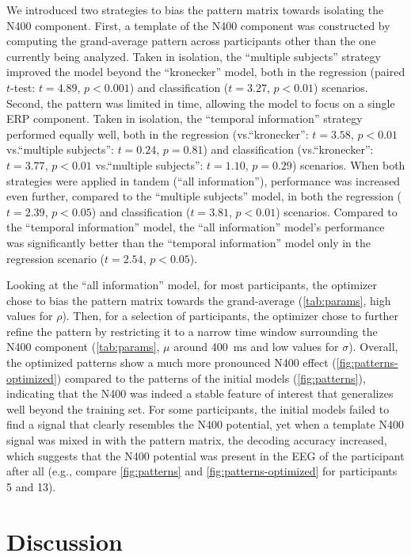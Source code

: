 \documentclass[a4paper]{vanvliet_paper}
\begin{document}
We introduced two strategies to bias the pattern matrix towards isolating the N400 component.
First, a template of the N400 component was constructed by computing the grand-average pattern across participants other than the one currently being analyzed.
Taken in isolation, the ``multiple subjects'' strategy improved the model beyond the ``kronecker'' model, both in the regression (paired $t$-test: $t=4.89$, $p<0.001$) and classification ($t=3.27$, $p<0.01$) scenarios.
Second, the pattern was limited in time, allowing the model to focus on a single \gls{ERP} component.
Taken in isolation, the ``temporal information'' strategy performed equally well, both in the regression (vs.\@ ``kronecker'': $t=3.58$, $p<0.01$ vs.\@ ``multiple subjects'': $t=0.24$, $p=0.81$) and classification (vs.\@ ``kronecker'': $t=3.77$, $p<0.01$ vs.\@ ``multiple subjects'': $t=1.10$, $p=0.29$) scenarios.
When both strategies were applied in tandem (``all information''), performance was increased even further, compared to the ``multiple subjects'' model, in both the regression ($t=2.39$, $p<0.05$) and classification ($t=3.81$, $p<0.01$) scenarios.
Compared to the ``temporal information'' model, the ``all information'' model's performance was significantly better than the ``temporal information'' model only in the regression scenario ($t=2.54$, $p<0.05$).

Looking at the ``all information'' model, for most participants, the optimizer chose to bias the pattern matrix towards the grand-average (\autoref{tab:params}, high values for $\rho$).
Then, for a selection of participants, the optimizer chose to further refine the pattern by restricting it to a narrow time window surrounding the N400 component (\autoref{tab:params}, $\mu$ around \SI{400}{\milli\second} and low values for $\sigma$).
Overall, the optimized patterns show a much more pronounced N400 effect (\autoref{fig:patterns-optimized}) compared to the patterns of the initial models (\autoref{fig:patterns}), indicating that the N400 was indeed a stable feature of interest that generalizes well beyond the training set.
For some participants, the initial models failed to find a signal that clearly resembles the N400 potential, yet when a template N400 signal was mixed in with the pattern matrix, the decoding accuracy increased, which suggests that the N400 potential was present in the \gls{EEG} of the participant after all (e.g., compare \autoref{fig:patterns} and \autoref{fig:patterns-optimized} for participants 5 and 13).


\section{Discussion}\label{sec:discussion}
\end{document}
